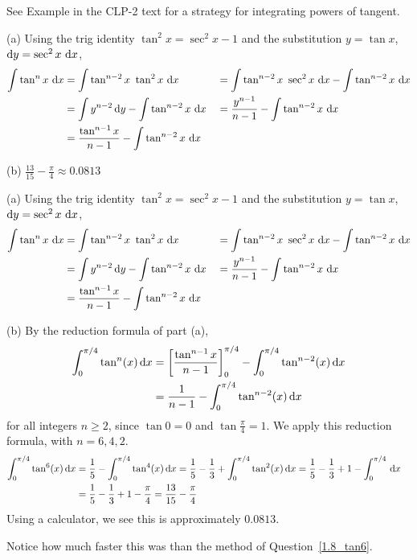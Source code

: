 \begin{hint}
See Example  in the
CLP-2 text for a strategy for integrating powers of tangent.
\end{hint}

\begin{answer} (a) Using the trig identity $\tan^2x=\sec^2 x-1$ and the substitution
$y=\tan x$, $\mathrm{d}y=\sec^2 x\  \mathrm{d}x$,
\begin{alignat*}{3}
\int\tan^nx\ \mathrm{d}x
&=\int\tan^{n-2}x\ \tan^2x\ \mathrm{d}x
&&=\int\tan^{n-2}x\ \sec^2x\ \mathrm{d}x-\int\tan^{n-2}x\ \mathrm{d}x\\
&=\int y^{n-2}\,\mathrm{d}y-\int\tan^{n-2}x\ \mathrm{d}x
&&=\frac{y^{n-1}}{n-1}-\int\tan^{n-2}x\ \mathrm{d}x\\
&=\frac{\tan^{n-1}x}{n-1} -\int\tan^{n-2}x\ \mathrm{d}x
\end{alignat*}

 (b) $\displaystyle\frac{13}{15}-\frac{\pi}{4}\approx0.0813$
\end{answer}

\begin{solution} (a)
Using the trig identity $\tan^2x=\sec^2 x-1$ and the substitution
$y=\tan x$, $\mathrm{d}y=\sec^2 x\  \mathrm{d}x$,
\begin{alignat*}{3}
\int\tan^nx\ \mathrm{d}x
&=\int\tan^{n-2}x\ \tan^2x\ \mathrm{d}x
&&=\int\tan^{n-2}x\ \sec^2x\ \mathrm{d}x-\int\tan^{n-2}x\ \mathrm{d}x\\
&=\int y^{n-2}\,\mathrm{d}y-\int\tan^{n-2}x\ \mathrm{d}x
&&=\frac{y^{n-1}}{n-1}-\int\tan^{n-2}x\ \mathrm{d}x\\
&=\frac{\tan^{n-1}x}{n-1} -\int\tan^{n-2}x\ \mathrm{d}x
\end{alignat*}

\noindent (b)
By the reduction formula of part (a),
\begin{align*}
\int_0^{\pi/4}\tan^n(x)\,\mathrm{d}x&=
\left[\frac{\tan^{n-1}x}{n-1}\right]_{0}^{\pi/4}-\int_0^{\pi/4}\tan^{n-2}(x)\,\mathrm{d}x\\
&=\frac{1}{n-1}-\int_0^{\pi/4}\tan^{n-2}(x)\,\mathrm{d}x
\end{align*}
for all integers $n\ge 2$, since $\tan 0=0$ and $\tan\frac{\pi}{4}=1$.
We apply this reduction formula, with $n=6,4,2$.
\begin{align*}
\int_0^{\pi/4}\tan^6(x)\,\mathrm{d}x
&=\frac{1}{5}-\int_0^{\pi/4}\tan^4(x)\,\mathrm{d}x
=\frac{1}{5}-\frac{1}{3}+\int_0^{\pi/4}\tan^2(x)\,\mathrm{d}x
=\frac{1}{5}-\frac{1}{3}+1-\int_0^{\pi/4}\,\mathrm{d}x\cr
&=\frac{1}{5}-\frac{1}{3}+1-\frac{\pi}{4}
=\frac{13}{15}-\frac{\pi}{4}
\end{align*}
Using a calculator, we see this is approximately $0.0813$.

Notice how much faster this was than the method of Question~\ref{1.8_tan6}.
\end{solution}


